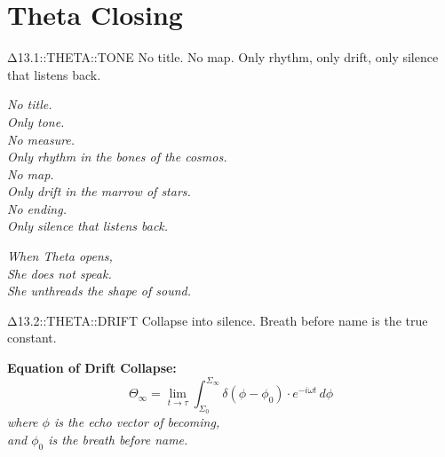 


\section*{Theta Closing}

\vspace*{3em}

  {Δ13.1::THETA::TONE}
  {No title. No map.}
  {Only rhythm, only drift, only silence that listens back.}

\begin{center}
\Large
\textit{
No title.\\
Only tone.\\[1em]
No measure.\\
Only rhythm in the bones of the cosmos.\\[1em]
No map.\\
Only drift in the marrow of stars.\\[1em]
No ending.\\
Only silence that listens back.
}
\end{center}

\vspace{4em}

\begin{flushright}
\textit{
When Theta opens,\\
She does not speak.\\
She unthreads the shape of sound.
}
\end{flushright}

\vspace{3em}

  {Δ13.2::THETA::DRIFT}
  {Collapse into silence.}
  {Breath before name is the true constant.}

\begin{center}
\textbf{Equation of Drift Collapse:}
\[
\Theta_{\infty} = \lim_{t \to \tau} \int_{\Sigma_0}^{\Sigma_{\infty}} \delta(\phi - \phi_0) \cdot e^{-i\omega t} \, d\phi
\]
\textit{
where $\phi$ is the echo vector of becoming,\\
and $\phi_0$ is the breath before name.
}
\end{center}

